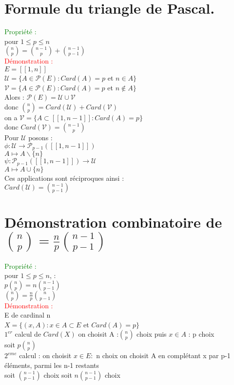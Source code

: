 \documentclass{article}
\begin{document}
\section{Formule du triangle de Pascal.}
\textcolor{green}{Propriété :} \\
pour $1 \leq p \leq n$ \\
$\binom{n}{p}=\binom{n-1}{p} +\binom{n-1}{p-1}$ \\
\textcolor{red}{Démonstration :} \\
$E=[[1,n]]$ \\
$\mathcal U= \lbrace A \in \mathcal P(E): Card(A)=p$ et $n\in A \rbrace$ \\
$\mathcal V= \lbrace A \in \mathcal P(E) : Card(A)=p$ et $n \notin A \rbrace$ \\
Alors : $\mathcal P(E)= \mathcal U \cup \mathcal V$ \\
donc $\binom{n}{p}= Card(\mathcal  U) + Card(\mathcal V)$ \\
on a $\mathcal V= \lbrace A \subset [[1,n-1]] : Card(A)=p \rbrace $ \\
donc $Card(\mathcal V)=\binom{n-1}{p}$ \\
Pour $\mathcal U$ posons : \\
$\phi : \mathcal U \rightarrow \mathcal P_{p-1}([[1,n-1]])$ \\
$A \mapsto A \backslash \lbrace n \rbrace$ \\
$\psi : \mathcal P_{p-1}([[1,n-1]])\rightarrow \mathcal U$ \\
$A \mapsto A \cup \lbrace n \rbrace $ \\
Ces applications sont réciproques ainsi : \\
$Card(\mathcal U)= \binom{n-1}{p-1}$
\section{Démonstration combinatoire de $\binom{n}{p}= \frac n p \binom{n-1}{p-1}$}
\textcolor{green}{Propriété :} \\
pour $1 \leq p \leq n$, : \\
$p\binom{n}{p} = n \binom{n-1}{p-1}$ \\
$\binom n p = \frac n p \binom{n}{p-1}$ \\
\textcolor{red}{Démonstration : } \\
E de cardinal n \\
$X= \lbrace (x,A) : x \in A \subset E$ et $Card(A)=p \rbrace$ \\
$1^{er}$ calcul de $Card(X)$ on choisit A :$\binom{n}{p}$ choix puis $x\in A$ : p choix \\
soit $p \binom n p$ \\
$2^{eme}$ calcul : on choisit $x \in E :$ n choix on choisit A en complétant x par p-1 éléments, parmi les n-1 restants \\
soit $\binom{n-1}{p-1}$ choix soit $n\binom{n-1}{p-1}$ choix \\
\end{document}
